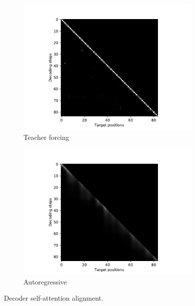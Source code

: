 \documentclass[11pt]{article}
\begin{document}
\begin{figure}
  \begin{subfigure}{0.5\textwidth}
    \centering
    \includegraphics[width=\textwidth, trim={2cm 0 2cm 0}, clip]{image/attention_decoder_forcing.pdf}
    \caption*{Teacher forcing}
  \end{subfigure}%
  \begin{subfigure}{0.5\textwidth}
    \centering
    \includegraphics[width=\textwidth, trim={2cm 0 2cm 0}, clip]{image/attention_decoder_autoreg.pdf}
    \caption*{Autoregressive}
  \end{subfigure}
  \caption{\label{fig:att-decoder}Decoder self-attention alignment.}
\end{figure}
\end{document}
